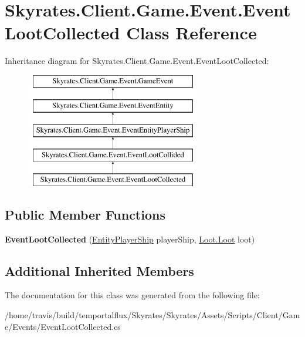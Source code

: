 \hypertarget{class_skyrates_1_1_client_1_1_game_1_1_event_1_1_event_loot_collected}{\section{Skyrates.\-Client.\-Game.\-Event.\-Event\-Loot\-Collected Class Reference}
\label{class_skyrates_1_1_client_1_1_game_1_1_event_1_1_event_loot_collected}
}
Inheritance diagram for Skyrates.\-Client.\-Game.\-Event.\-Event\-Loot\-Collected\-:\begin{figure}[H]
\begin{center}
\leavevmode
\includegraphics[height=5.000000cm]{class_skyrates_1_1_client_1_1_game_1_1_event_1_1_event_loot_collected}
\end{center}
\end{figure}
\subsection*{Public Member Functions}
\begin{DoxyCompactItemize}
\item 
\hypertarget{class_skyrates_1_1_client_1_1_game_1_1_event_1_1_event_loot_collected_a57811ed7da0562397ff808b1d7e7d798}{{\bfseries Event\-Loot\-Collected} (\hyperlink{class_skyrates_1_1_client_1_1_entity_player_ship}{Entity\-Player\-Ship} player\-Ship, \hyperlink{class_skyrates_1_1_client_1_1_loot_1_1_loot}{Loot.\-Loot} loot)}\label{class_skyrates_1_1_client_1_1_game_1_1_event_1_1_event_loot_collected_a57811ed7da0562397ff808b1d7e7d798}

\end{DoxyCompactItemize}
\subsection*{Additional Inherited Members}


The documentation for this class was generated from the following file\-:\begin{DoxyCompactItemize}
\item 
/home/travis/build/temportalflux/\-Skyrates/\-Skyrates/\-Assets/\-Scripts/\-Client/\-Game/\-Events/Event\-Loot\-Collected.\-cs\end{DoxyCompactItemize}
